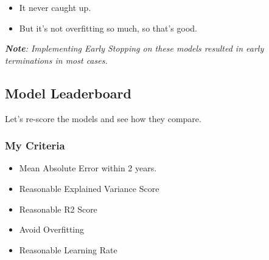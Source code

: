 \documentclass[11pt]{article}
\providecommand{\tightlist}{%
      \setlength{\itemsep}{0pt}\setlength{\parskip}{0pt}}
\begin{document}
\begin{itemize}
\tightlist
\item
  It never caught up.
\item
  But it's not overfitting so much, so that's good.
\end{itemize}

\emph{\textbf{Note}: Implementing Early Stopping on these models
resulted in early terminations in most cases.}

    \subsection{Model Leaderboard}\label{model-leaderboard}

Let's re-score the models and see how they compare.

\subsubsection{My Criteria}\label{my-criteria}

\begin{itemize}
\tightlist
\item
  Mean Absolute Error within 2 years.
\item
  Reasonable Explained Variance Score
\item
  Reasonable R2 Score
\item
  Avoid Overfitting
\item
  Reasonable Learning Rate
\end{itemize}
\end{document}
